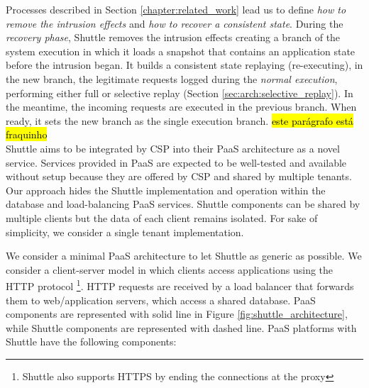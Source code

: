 Processes described in Section \ref{chapter:related_work} lead us to define \textit{how to remove the intrusion effects} and \textit{how to recover a consistent state}. During the \emph{recovery phase}, Shuttle removes the intrusion effects creating a branch of the system execution in which it loads a snapshot that contains an application state before the intrusion began. It builds a consistent state replaying (re-executing), in the new branch, the legitimate requests logged during the \emph{normal execution}, performing either full or selective replay (Section \ref{sec:arch:selective_replay}). In the meantime, the incoming requests are executed in the previous branch. When ready, it sets the new branch as the single execution branch. \hl{este parágrafo está fraquinho}\\



Shuttle aims to be integrated by \acf{CSP} into their \ac{PaaS} architecture as a novel service. Services provided in \ac{PaaS} are expected to be well-tested and available without setup because they are offered by \ac{CSP} and shared by multiple tenants. Our approach hides the Shuttle implementation and operation within the database and load-balancing \ac{PaaS} services. Shuttle components can be shared by multiple clients but the data of each client remains isolated. For sake of simplicity, we consider a single tenant implementation.

We consider a minimal \ac{PaaS} architecture to let Shuttle as generic as possible. We consider a client-server model in which clients access applications using the \ac{HTTP} protocol \footnote{Shuttle also supports HTTPS by ending the connections at the proxy}. \ac{HTTP} requests are received by a load balancer that forwards them to web/application servers, which access a shared database. {PaaS} components are represented with solid line in Figure \ref{fig:shuttle_architecture}, while Shuttle components are represented with dashed line. \ac{PaaS} platforms with Shuttle have the following components:

